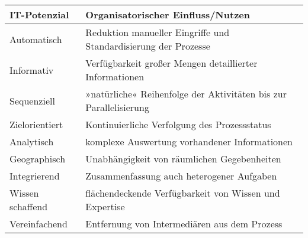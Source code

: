 \begin{tabularx}{\textwidth}{|l|X|} \hline
  IT-Potenzial     & Organisatorischer Einfluss/Nutzen \\\hline\hline
  Automatisch      & Reduktion manueller Eingriffe und Standardisierung der Prozesse \\\hline
  Informativ       & Verfügbarkeit großer Mengen detaillierter Informationen \\\hline
  Sequenziell      & »natürliche« Reihenfolge der Aktivitäten bis zur Parallelisierung \\\hline
  Zielorientiert   & Kontinuierliche Verfolgung des Prozessstatus \\\hline
  Analytisch       & komplexe Auswertung vorhandener Informationen \\\hline
  Geographisch     & Unabhängigkeit von räumlichen Gegebenheiten \\\hline
  Integrierend     & Zusammenfassung auch heterogener Aufgaben \\\hline
  Wissen schaffend & flächendeckende Verfügbarkeit von Wissen und Expertise \\\hline
  Vereinfachend    & Entfernung von Intermediären aus dem Prozess \\\hline
\end{tabularx}
